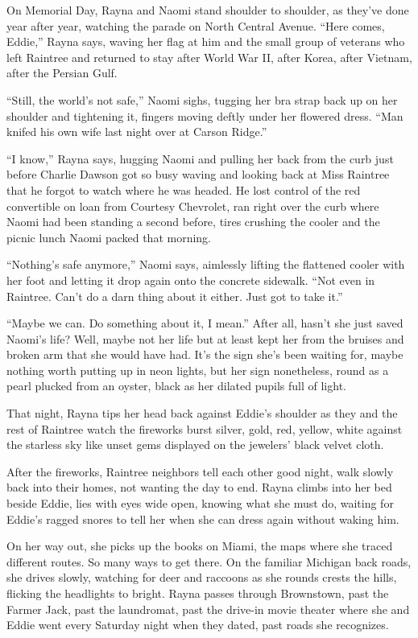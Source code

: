 \documentclass[
]{article}
\begin{document}
On Memorial Day, Rayna and Naomi stand shoulder to shoulder, as they've
done year after year, watching the parade on North Central Avenue.
``Here comes, Eddie,'' Rayna says, waving her flag at him and the small
group of veterans who left Raintree and returned to stay after World War
II, after Korea, after Vietnam, after the Persian Gulf.

``Still, the world's not safe,'' Naomi sighs, tugging her bra strap back
up on her shoulder and tightening it, fingers moving deftly under her
flowered dress. ``Man knifed his own wife last night over at Carson
Ridge.''

``I know,'' Rayna says, hugging Naomi and pulling her back from the curb
just before Charlie Dawson got so busy waving and looking back at Miss
Raintree that he forgot to watch where he was headed. He lost control of
the red convertible on loan from Courtesy Chevrolet, ran right over the
curb where Naomi had been standing a second before, tires crushing the
cooler and the picnic lunch Naomi packed that morning.

``Nothing's safe anymore,'' Naomi says, aimlessly lifting the flattened
cooler with her foot and letting it drop again onto the concrete
sidewalk. ``Not even in Raintree. Can't do a darn thing about it either.
Just got to take it.''

``Maybe we can. Do something about it, I mean.'' After all, hasn't she
just saved Naomi's life? Well, maybe not her life but at least kept her
from the bruises and broken arm that she would have had. It's the sign
she's been waiting for, maybe nothing worth putting up in neon lights,
but her sign nonetheless, round as a pearl plucked from an oyster, black
as her dilated pupils full of light.

That night, Rayna tips her head back against Eddie's shoulder as they
and the rest of Raintree watch the fireworks burst silver, gold, red,
yellow, white against the starless sky like unset gems displayed on the
jewelers' black velvet cloth.

After the fireworks, Raintree neighbors tell each other good night, walk
slowly back into their homes, not wanting the day to end. Rayna climbs
into her bed beside Eddie, lies with eyes wide open, knowing what she
must do, waiting for Eddie's ragged snores to tell her when she can
dress again with­out waking him.

On her way out, she picks up the books on Miami, the maps where she
traced different routes. So many ways to get there. On the familiar
Michigan back roads, she drives slowly, watching for deer and raccoons
as she rounds crests the hills, flicking the headlights to bright. Rayna
passes through Brownstown, past the Farmer Jack, past the laundromat,
past the drive-in movie theater where she and Eddie went every Saturday
night when they dated, past roads she recognizes.
\end{document}
